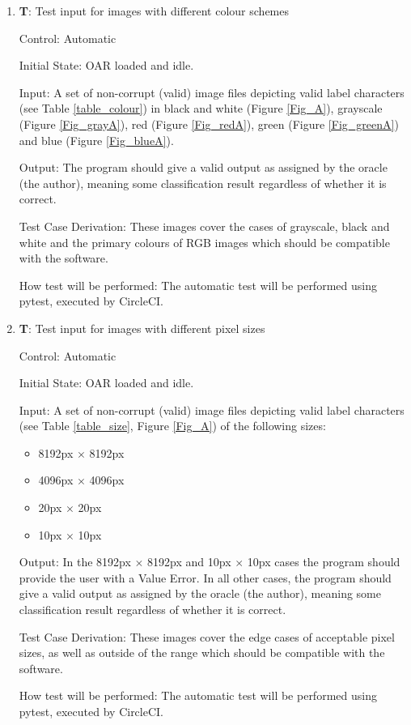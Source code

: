 \documentclass[12pt, titlepage]{article}
\newcounter{testnum} %
\begin{document}
\begin{enumerate}

  \item{\textbf{T\thetestnum \label{T_inputColour}}: Test input for images with different colour schemes\\}
            
  Control: Automatic
            
  Initial State: OAR loaded and idle.
            
  Input: A set of non-corrupt (valid) image files depicting valid label characters (see Table \ref{table_colour}) in black and white (Figure \ref{Fig_A}), 
  grayscale (Figure \ref{Fig_grayA}), red (Figure \ref{Fig_redA}), green (Figure \ref{Fig_greenA}) and blue (Figure \ref{Fig_blueA}).

  
  Output:  The program should give a valid output as assigned by the oracle (the author), meaning some classification result regardless
  of whether it is correct.
            
  Test Case Derivation: These images cover the cases of grayscale, black and white and the primary colours of RGB images which should be compatible with the software.
            
  How test will be performed: The automatic test will be performed using pytest, executed by CircleCI.

  \item{\textbf{T\thetestnum \label{T_inputSize}}: Test input for images with different pixel sizes\\}
            
  Control: Automatic
            
  Initial State: OAR loaded and idle.
            
  Input: A set of non-corrupt (valid) image files depicting valid label characters (see Table \ref{table_size}, Figure \ref{Fig_A}) of the following sizes:
  \begin{itemize}
    \item{8192px $\times$ 8192px}
    \item{4096px $\times$ 4096px}
    \item{20px $\times$ 20px}
    \item{10px $\times$ 10px}
  \end{itemize}
            
  Output: In the 8192px $\times$ 8192px and 10px $\times$ 10px cases the program should provide the user with a Value Error. In all other cases,
  the program should give a valid output as assigned by the oracle (the author), meaning some classification result regardless
  of whether it is correct.
            
  Test Case Derivation: These images cover the edge cases of acceptable pixel sizes, as well as outside of the range which should be compatible with the software.
            
  How test will be performed: The automatic test will be performed using pytest, executed by CircleCI.

\end{enumerate}
\end{document}
